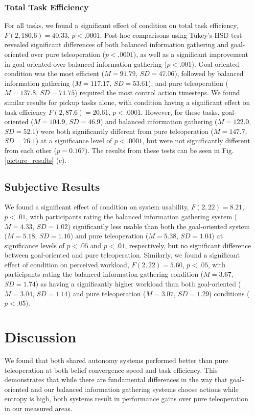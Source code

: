 \documentclass[conference]{IEEEtran}
\begin{document}
\subsubsection{Total Task Efficiency}

For all tasks, we found a significant effect of condition on total task efficiency, $F(2, 180.6) = 40.33$, $p < .0001$. Post-hoc comparisons using Tukey's HSD test revealed significant differences of both balanced information gathering and goal-oriented over pure teleoperation ($p < .0001$), as well as a significant improvement in goal-oriented over balanced information gathering ($p < .001$). Goal-oriented condition was the most efficient ($M = 91.79$, $SD = 47.06$), followed by balanced information gathering ($M = 117.17$, $SD = 53.61$), and pure teleoperation ($M = 137.8$, $SD = 71.75$) required the most control action timesteps. We found similar results for pickup tasks alone, with condition having a significant effect on task efficiency $F(2, 87.6) = 20.61$, $p < .0001$. However, for these tasks, goal-oriented ($M = 104.9$, $SD = 46.9$) and balanced information gathering ($M = 122.0$, $SD = 52.1$) were both significantly different from pure teleoperation ($M = 147.7$, $SD = 76.1$) at a significance level of $p < .0001$, but were not significantly different from each other ($p = 0.167$). The results from these tests can be seen in Fig. \ref{picture_results} (c).

\subsection{Subjective Results}

We found a significant effect of condition on system usability, $F(2, 22) = 8.21$, $p < .01$, with participants rating the balanced information gathering system ($M = 4.33$, $SD = 1.02$) significantly less usable than both the goal-oriented system ($M = 5.18$, $SD = 1.16$) and pure teleoperation ($M = 5.38$, $SD = 1.04$) at significance levels of $p < .05$ and $p < .01$, respectively, but no significant difference between goal-oriented and pure teleoperation. Similarly, we found a significant effect of condition on perceived workload, $F(2, 22) = 5.60$, $p < .05$, with participants rating the balanced information gathering condition ($M = 3.67$, $SD = 1.74$) as having a significantly higher workload than both goal-oriented ($M = 3.04$, $SD = 1.14$) and pure teleoperation ($M = 3.07$, $SD = 1.29$) conditions ($p < .05$).

\section{Discussion}
We found that both shared autonomy systems performed better than pure teleoperation at both belief convergence speed and task efficiency. This demonstrates that while there are fundamental differences in the way that goal-oriented and our balanced information gathering systems choose actions while entropy is high, both systems result in performance gains over pure teleoperation in our measured areas.
\end{document}
